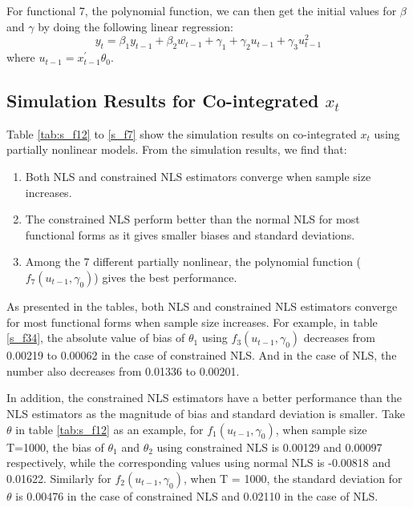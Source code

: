 \documentclass[a4paper,12pt,times,numbered,print,index]{report}
\numberwithin{equation}{section}
\begin{document}
For functional 7, the polynomial function, we can then get the initial values for $\beta$ and $\gamma$ by doing the following linear regression:
$$
y_t = \beta_{1}y_{t-1} + \beta_2w_{t-1} + \gamma_{1}+ \gamma_{2}u_{t-1}+\gamma_{3}u_{t-1}^{2}
$$
where $u_{t-1} =  x_{t-1}^{\prime }\theta _{0}$.

\subsection{Simulation Results for Co-integrated $x_t$}
Table \ref{tab:s_f12} to \ref{s_f7} show the simulation results on co-integrated $x_t$ using partially nonlinear models. From the simulation results, we find that:

\begin{enumerate}
    \item Both NLS and constrained NLS estimators converge when sample size increases.
    
    \item The constrained NLS perform better than the normal NLS for most functional forms as it gives smaller biases and standard deviations.
    
    \item Among the 7 different partially nonlinear, the polynomial function ($f_7(u_{t-1}, \gamma_0)$) gives the best performance.
    
\end{enumerate}

As presented in the tables, both NLS and constrained NLS estimators converge for most functional forms when sample size increases. For example, in table \ref{s_f34}, the absolute value of bias of $\theta_1$ using $f_3(u_{t-1}, \gamma_0)$ decreases from 0.00219 to 0.00062 in the case of constrained NLS. And in the case of NLS, the number also decreases from 0.01336 to 0.00201.

In addition, the constrained NLS estimators have a better performance than the NLS estimators as the magnitude of bias and standard deviation is smaller. 
Take $\theta$ in table \ref{tab:s_f12} as an example, for $f_1(u_{t-1}, \gamma_0)$, when sample size T=1000, the bias of $\theta_1$ and $\theta_2$ using constrained NLS is 0.00129 and 0.00097 respectively, while the corresponding values using normal NLS is -0.00818 and 0.01622. Similarly for $f_2(u_{t-1}, \gamma_0)$, when T = 1000, the standard deviation for $\theta$ is 0.00476 in the case of constrained NLS and 0.02110 in the case of NLS.  
\end{document}
